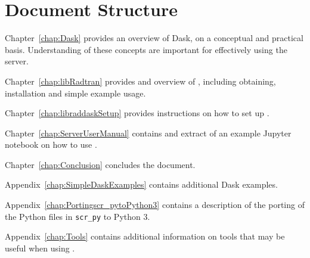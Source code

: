 \section{Document Structure}
\label{sec:DocumentStructure}

Chapter~\ref{chap:Dask} provides an overview of Dask, on a conceptual and practical basis.  Understanding of these concepts are important for effectively using the server.

Chapter~\ref{chap:libRadtran}  provides and overview of \libradtran{}, including obtaining, installation and simple example usage.

Chapter~\ref{chap:libraddaskSetup}  provides instructions on how to set up \libraddask{}.

Chapter~\ref{chap:ServerUserManual}  contains and extract of an example Jupyter notebook on how to use  \libraddask{}.

Chapter~\ref{chap:Conclusion} concludes the document.

Appendix~\ref{chap:SimpleDaskExamples} contains additional Dask examples.

Appendix~\ref{chap:Portingscr_pytoPython3}  contains a description of the porting of the \libradtran{} Python files in \lstinline{scr_py} to Python 3.

Appendix~\ref{chap:Tools}  contains additional information on tools that may be useful when using \libraddask{}.
 